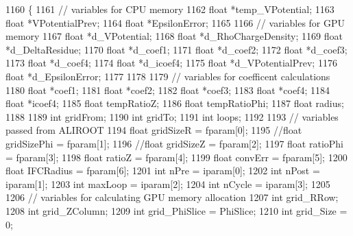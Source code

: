 \begin{DoxyCode}
1160 \{
1161     \textcolor{comment}{// variables for CPU memory}
1162     \textcolor{keywordtype}{float} *temp\_VPotential;
1163     \textcolor{keywordtype}{float} *VPotentialPrev;
1164     \textcolor{keywordtype}{float} *EpsilonError;        
1165 
1166     \textcolor{comment}{// variables for GPU memory }
1167     \textcolor{keywordtype}{float} *d\_VPotential;
1168     \textcolor{keywordtype}{float} *d\_RhoChargeDensity;
1169     \textcolor{keywordtype}{float} *d\_DeltaResidue;
1170     \textcolor{keywordtype}{float} *d\_coef1;
1171     \textcolor{keywordtype}{float} *d\_coef2;
1172     \textcolor{keywordtype}{float} *d\_coef3;
1173     \textcolor{keywordtype}{float} *d\_coef4;
1174     \textcolor{keywordtype}{float} *d\_icoef4;
1175     \textcolor{keywordtype}{float} *d\_VPotentialPrev;
1176     \textcolor{keywordtype}{float} *d\_EpsilonError;
1177     
1178 
1179     \textcolor{comment}{// variables for coefficent calculations}
1180     \textcolor{keywordtype}{float} *coef1;
1181     \textcolor{keywordtype}{float} *coef2;
1182     \textcolor{keywordtype}{float} *coef3;
1183     \textcolor{keywordtype}{float} *coef4;
1184     \textcolor{keywordtype}{float} *icoef4;
1185     \textcolor{keywordtype}{float} tempRatioZ;
1186     \textcolor{keywordtype}{float} tempRatioPhi;
1187     \textcolor{keywordtype}{float} radius;
1188 
1189     \textcolor{keywordtype}{int} gridFrom;
1190     \textcolor{keywordtype}{int} gridTo; 
1191     \textcolor{keywordtype}{int} loops;
1192 
1193     \textcolor{comment}{// variables passed from ALIROOT}
1194     \textcolor{keywordtype}{float} gridSizeR     = fparam[0];
1195     \textcolor{comment}{//float gridSizePhi = fparam[1];}
1196     \textcolor{comment}{//float gridSizeZ       = fparam[2];}
1197     \textcolor{keywordtype}{float} ratioPhi      = fparam[3];
1198     \textcolor{keywordtype}{float} ratioZ        = fparam[4];
1199     \textcolor{keywordtype}{float} convErr       = fparam[5];
1200     \textcolor{keywordtype}{float} IFCRadius     = fparam[6];
1201     \textcolor{keywordtype}{int} nPre    = iparam[0];
1202     \textcolor{keywordtype}{int} nPost   = iparam[1];
1203     \textcolor{keywordtype}{int} maxLoop = iparam[2];
1204     \textcolor{keywordtype}{int} nCycle  = iparam[3];
1205 
1206     \textcolor{comment}{// variables for calculating GPU memory allocation}
1207     \textcolor{keywordtype}{int} grid\_RRow;
1208     \textcolor{keywordtype}{int} grid\_ZColumn;
1209     \textcolor{keywordtype}{int} grid\_PhiSlice = PhiSlice;
1210     \textcolor{keywordtype}{int} grid\_Size = 0;

\end{DoxyCode}
